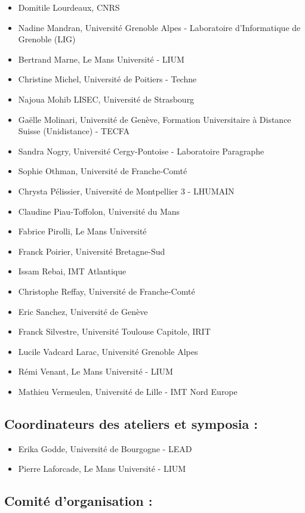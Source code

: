 \begin{itemize}
	\item[] Domitile Lourdeaux, CNRS
	\item[] Nadine Mandran, Université Grenoble Alpes - Laboratoire d'Informatique de Grenoble (LIG)
	\item[] Bertrand Marne, Le Mans Université - LIUM
	\item[] Christine Michel, Université de Poitiers - Techne
	\item[] Najoua Mohib LISEC, Université de Strasbourg
	\item[] Gaëlle Molinari, Université de Genève, Formation Universitaire à Distance Suisse (Unidistance) - TECFA
	\item[] Sandra Nogry, Université Cergy-Pontoise - Laboratoire Paragraphe
	\item[] Sophie Othman, Université de Franche-Comté
	\item[] Chrysta Pélissier, Université de Montpellier 3 - LHUMAIN 
	\item[] Claudine Piau-Toffolon, Université du Mans
	\item[] Fabrice Pirolli, Le Mans Université
	\item[] Franck Poirier, Université Bretagne-Sud
	\item[] Issam Rebai, IMT Atlantique
	\item[] Christophe Reffay, Université de Franche-Comté
	\item[] Eric Sanchez, Université de Genève
	\item[] Franck Silvestre, Université Toulouse Capitole, IRIT
	\item[] Lucile Vadcard Larac, Université Grenoble Alpes
	\item[] Rémi Venant, Le Mans Université - LIUM
	\item[] Mathieu Vermeulen, Université de Lille - IMT Nord Europe
\end{itemize}

\subsection*{Coordinateurs des ateliers et symposia : }

\begin{itemize}
	\item[]Erika Godde, Université de Bourgogne - LEAD
	\item[]Pierre Laforcade, Le Mans Université - LIUM
\end{itemize}

\subsection*{Comité d'organisation :}

